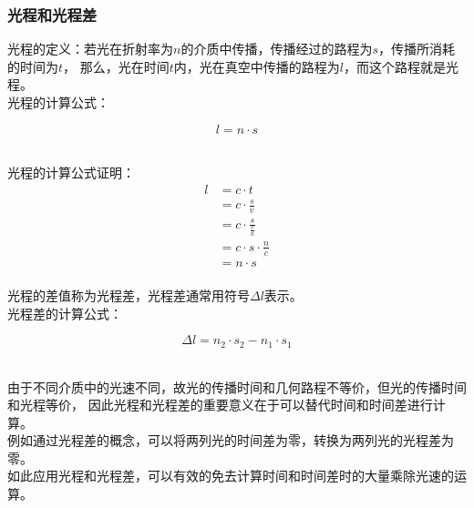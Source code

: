 \documentclass[UTF8]{ctexart}
\begin{document}
\newpage

\subsubsection{光程和光程差}
    光程的定义：若光在折射率为$n$的介质中传播，传播经过的路程为$s$，传播所消耗的时间为$t$，
    那么，光在时间$t$内，光在真空中传播的路程为$l$，而这个路程就是光程。\\[3mm]
    光程的计算公式：
    \begin{large}
        \begin{equation*}
            l=n\cdot s
        \end{equation*}
    \end{large}\\
    光程的计算公式证明：
    \setcounter{equation}{0}
    \begin{align}
        l
        &=c\cdot t\\[3mm]
        &=c\cdot\frac{s}{v}\\[3mm]
        &=c\cdot\frac{s}{\frac{c}{n}}\\[3mm]
        &=c\cdot s\cdot\frac{n}{c}\\[3mm]
        &=n\cdot s
    \end{align}\\
    光程的差值称为光程差，光程差通常用符号$\Delta l$表示。\\[3mm]
    光程差的计算公式：
    \begin{large}
        \begin{equation*}
            \Delta l=n_2\cdot s_2-n_1\cdot s_1                
        \end{equation*}
    \end{large}\\
    由于不同介质中的光速不同，故光的传播时间和几何路程不等价，但光的传播时间和光程等价，
    因此光程和光程差的重要意义在于可以替代时间和时间差进行计算。\\[3mm]
    例如通过光程差的概念，可以将两列光的时间差为零，转换为两列光的光程差为零。\\[3mm]
    如此应用光程和光程差，可以有效的免去计算时间和时间差时的大量乘除光速的运算。\\

\newpage
\end{document}
